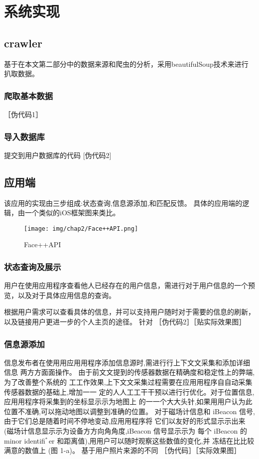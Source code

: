 
\chapter{系统实现}
\section{crawler}
基于在本文第二部分中的数据来源和爬虫的分析，采用beautifulSoup技术来进行扒取数据。
\subsection{爬取基本数据}
［伪代码1］
\subsection{导入数据库}
提交到用户数据库的代码
[伪代码2]

\section{应用端}
该应用的实现由三步组成:状态查询,信息源添加,和匹配反馈。
具体的应用端的逻辑，由一个类似的iOS框架图来类比。
\begin{figure}[h]
\begin{minipage}[t]{0.45\linewidth}
\centering
\texttt{[image: img/chap2/Face++API.png]}
\caption{Face++API\label{Face++API}}
\end{minipage}
\end{figure}

\subsection{状态查询及展示}
用户在使⽤应⽤程序查看他人已经存在的用户信息，需进行对于用户信息的一个预览，以及对于具体应用信息的查询。

根据用户需求可以查看具体的信息，并可以支持用户随时对于需要的信息的刷新，以及链接用户更进一步的个人主页的途径。
针对
［伪代码2］［贴实际效果图］
\subsection{信息源添加}
信息发布者在使⽤用应⽤用程序添加信息源时,需进⾏行上下⽂文采集和添加详细信息 两⽅方⾯面操作。
由于前⽂文提到的传感器数据在精确度和稳定性上的弊端,为了改善整个系统的 ⼯工作效果,上下⽂文采集过程需要在应⽤用程序⾃自动采集传感器数据的基础上,增加⼀一 定的⼈人⼯工⼲干预以进⾏行优化。对于位置信息,应⽤用程序将采集到的坐标显⽰示为地图上 的⼀一个⼤大头针,如果⽤用户认为此位置不准确,可以拖动地图以调整到准确的位置。 对于磁场计信息和 iBeacon 信号,由于它们总是随着时间不停地变动,应⽤用程序将 它们以友好的形式显⽰示出来 (磁场计信息显⽰示为设备⽅方向⾓角度,iBeacon 信号显⽰示为 每个 iBeacon 的 minor identiﬁﾞer 和距离值),⽤用户可以随时观察这些数值的变化,并 冻结在⽐比较满意的数值上 (图 1-a)。
基于用户照片来源的不同
［伪代码］［实际效果图］

